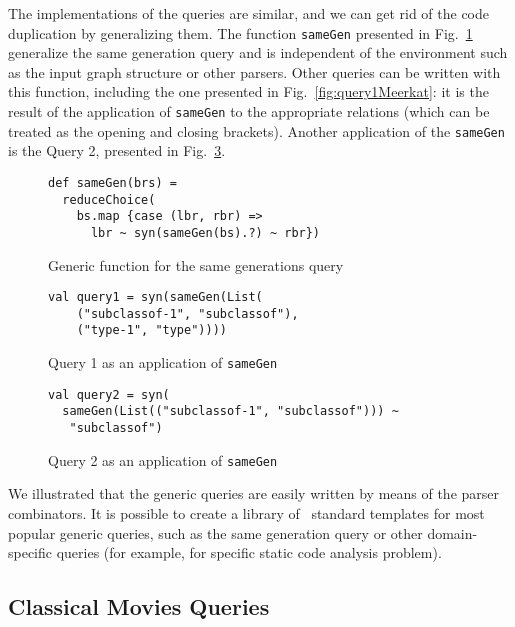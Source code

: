 The implementations of the queries are similar, and we can get rid of the code duplication by generalizing them.
The function \lstinline{sameGen} presented in Fig.~\ref{fig:gen} generalize the same generation query and is independent of the environment such as the input graph structure or other parsers.
Other queries can be written with this function, including the one presented in Fig.~\ref{fig:query1Meerkat}: it is the result of the application of \lstinline{sameGen} to the appropriate relations (which can be treated as the opening and closing brackets).
Another application of the \lstinline{sameGen} is the Query 2, presented in Fig.~\ref{fig:query2Gen}.

\begin{figure}[h]
\begin{lstlisting}
def sameGen(brs) =
  reduceChoice(
    bs.map {case (lbr, rbr) =>
      lbr ~ syn(sameGen(bs).?) ~ rbr})
\end{lstlisting}
\caption{Generic function for the same generations query}
\label{fig:gen}
\end{figure}


\begin{figure}[h]
\begin{lstlisting}
val query1 = syn(sameGen(List(
    ("subclassof-1", "subclassof"),
    ("type-1", "type"))))
\end{lstlisting}
\caption{Query 1 as an application of \lstinline{sameGen}}
\label{fig:query1Gen}
\end{figure}


\begin{figure}[h]
\begin{lstlisting}
val query2 = syn(
  sameGen(List(("subclassof-1", "subclassof"))) ~
   "subclassof")
\end{lstlisting}
\caption{Query 2 as an application of \lstinline{sameGen}}
\label{fig:query2Gen}
\end{figure}


We illustrated that the generic queries are easily written by means of the parser combinators.
It is possible to create a library of \ standard templates for most popular generic queries, such as the same generation query or other domain-specific queries (for example, for specific static code analysis problem).


\subsection{Classical Movies Queries}

